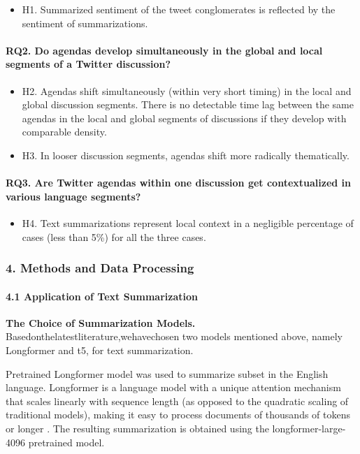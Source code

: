 \begin{itemize}
	\item H1. Summarized sentiment of the tweet conglomerates is reflected by the sentiment of summarizations.
\end{itemize}

\paragraph{RQ2. Do agendas develop simultaneously in the global and local segments of a Twitter discussion?}

\begin{itemize}
	\item H2. Agendas shift simultaneously (within very short timing) in the local and global discussion segments. There is no detectable time lag between the same agendas in the local and global segments of discussions if they develop with comparable density.
	\item H3. In looser discussion segments, agendas shift more radically thematically.
\end{itemize}

\paragraph{RQ3. Are Twitter agendas within one discussion get contextualized in various language segments?}

\begin{itemize}
	\item H4. Text summarizations represent local context in a negligible percentage of cases (less than 5\%) for all the three cases.
\end{itemize}

\subsubsection{4. Methods and Data Processing}

\paragraph{4.1 Application of Text Summarization}

\textbf{The Choice of Summarization Models.} Basedonthelatestliterature,wehavechosen two models mentioned above, namely Longformer and t5, for text summarization.

Pretrained Longformer model was used to summarize subset in the English language. Longformer is a language model with a unique attention mechanism that scales linearly with sequence length (as opposed to the quadratic scaling of traditional models), making it easy to process documents of thousands of tokens or longer \cite{AsgariChenaghluNikzadKhasmakhiMinaee}. The resulting summarization is obtained using the longformer-large-4096 pretrained model.

